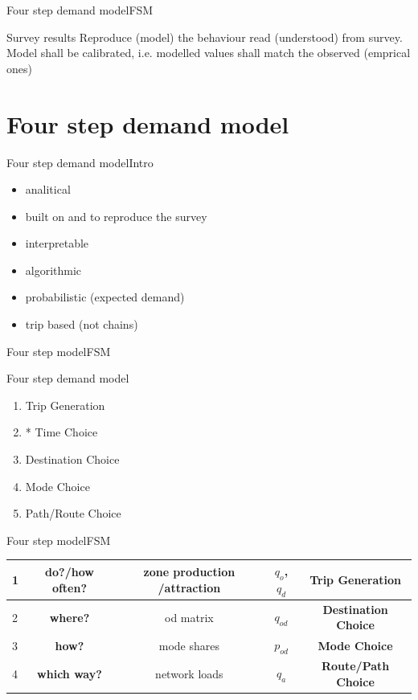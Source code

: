 \documentclass[8pt]{beamer}
\begin{document}
\begin{frame}{Four step demand model}{FSM}
	\begin{block}{Survey results}
		Reproduce (model) the behaviour read (understood) from survey.
		\\
		Model shall be calibrated, i.e. modelled values shall match the observed (emprical ones)
		
	\end{block}	
\end{frame}

\section{Four step demand model}
\begin{frame}{Four step demand model}{Intro}
\begin{itemize}
\item analitical
\item built on and to reproduce the survey
\item interpretable
\item algorithmic 
\item probabilistic (expected demand)
\item trip based (not chains)
\end{itemize}
\end{frame}

\begin{frame}{Four step model}{FSM}
	\begin{block}{Four step demand model}
		\begin{enumerate}
		\item Trip Generation
		\item * Time Choice
		\item Destination Choice
		\item Mode Choice
		\item Path/Route Choice
		\end{enumerate}	
	\end{block}	
\end{frame}


\begin{frame}{Four step model}{FSM}
\begin{table}[]
\begin{tabular}{l|c|c|c|c}
1 & \textbf{do?/how often?} &  zone production /attraction & $q_o$, $q_d$ & \textbf{Trip Generation}\\ \hline 
2 & \textbf{where?} &  od matrix & $q_{od}$ & \textbf{Destination Choice}\\ \hline 
3 & \textbf{how?} &  mode shares  & $p_{od}$ & \textbf{Mode Choice}\\ \hline 
4 & \textbf{which way?} &  network loads & $q_a$ & \textbf{Route/Path Choice}\\ \hline 
\end{tabular}
\end{table}
\end{frame}
\end{document}
